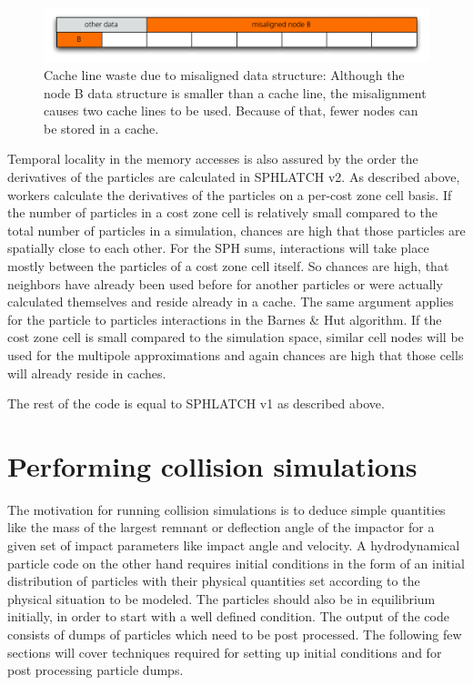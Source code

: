 \begin{figure}[htbp]
\begin{center}
\includegraphics[scale=0.6]{30algo_misalign.pdf}
\caption{Cache line waste due to misaligned data structure: Although the node B data structure is smaller than a cache line, the misalignment causes two cache lines to be used. Because of that, fewer nodes can be stored in a cache.}
\label{ch02_fig30}
\end{center}
\end{figure}

Temporal locality in the memory accesses is also assured by the order the derivatives of the particles are calculated in SPHLATCH v2. As described above, workers calculate the derivatives of the particles on a per-cost zone cell basis. If the number of particles in a cost zone cell is relatively small compared to the total number of particles in a simulation, chances are high that those particles are spatially close to each other. For the SPH sums, interactions will take place mostly between the particles of a cost zone cell itself. So chances are high, that neighbors have already been used before for another particles or were actually calculated themselves and reside already in a cache. The same argument applies for the particle to particles interactions in the Barnes \& Hut algorithm. If the cost zone cell is small compared to the simulation space, similar cell nodes will be used for the multipole approximations and again chances are high that those cells will already reside in caches.

The rest of the code is equal to SPHLATCH v1 as described above.


\section{Performing collision simulations}
The motivation for running collision simulations is to deduce simple quantities like the mass of the largest remnant or deflection angle of the impactor for a given set of impact parameters like impact angle and velocity. A hydrodynamical particle code on the other hand requires initial conditions in the form of an initial distribution of particles with their physical quantities set according to the physical situation to be modeled. The particles should also be in equilibrium initially, in order to start with a well defined condition.
The output of the code consists of dumps of particles which need to be post processed. The following few sections will cover techniques required for setting up initial conditions and for post processing particle dumps.

